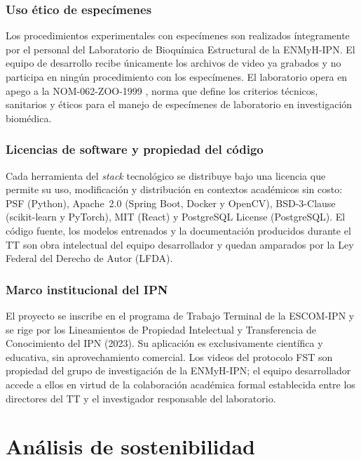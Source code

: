 \subsubsection{Uso ético de especímenes}

Los procedimientos experimentales con especímenes son realizados íntegramente por el personal
del Laboratorio de Bioquímica Estructural de la ENMyH-IPN. El equipo de desarrollo
recibe únicamente los archivos de video ya grabados y no participa en ningún procedimiento
con los especímenes. El laboratorio opera en apego a la NOM-062-ZOO-1999
\cite{nom062}, norma que define los criterios técnicos, sanitarios y éticos para el
manejo de especímenes de laboratorio en investigación biomédica.

\subsubsection{Licencias de software y propiedad del código}

Cada herramienta del \textit{stack} tecnológico se distribuye bajo una licencia que
permite su uso, modificación y distribución en contextos académicos sin costo:
PSF (Python), Apache~2.0 (Spring Boot, Docker y OpenCV), BSD-3-Clause (scikit-learn y PyTorch), MIT (React) y
PostgreSQL License (PostgreSQL).
El código fuente, los modelos entrenados y la documentación
producidos durante el TT son obra intelectual del equipo desarrollador y quedan
amparados por la Ley Federal del Derecho de Autor (LFDA).

\subsubsection{Marco institucional del IPN}

El proyecto se inscribe en el programa de Trabajo Terminal de la ESCOM-IPN y se rige
por los Lineamientos de Propiedad Intelectual y Transferencia de Conocimiento del
IPN (2023). Su aplicación es exclusivamente científica y educativa, sin
aprovechamiento comercial. Los videos del protocolo FST son propiedad del grupo de
investigación de la ENMyH-IPN; el equipo desarrollador accede a ellos en virtud de la
colaboración académica formal establecida entre los directores del TT y el investigador responsable del laboratorio.

\section{Análisis de sostenibilidad}

